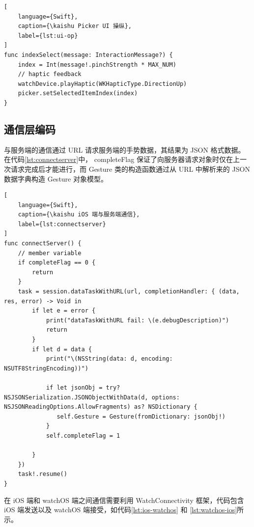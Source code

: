\begin{lstlisting}[
    language={Swift},
    caption={\kaishu Picker UI 操纵},
    label={lst:ui-op}
]
func indexSelect(message: InteractionMessage?) {
    index = Int(message!.pinchStrength * MAX_NUM)
    // haptic feedback
    watchDevice.playHaptic(WKHapticType.DirectionUp)
    picker.setSelectedItemIndex(index)
}
\end{lstlisting}

\subsection{通信层编码}

与服务端的通信通过 URL 请求服务端的手势数据，其结果为 JSON 格式数据。在代码\ref{lst:connectserver}中， completeFlag 保证了向服务器请求对象时仅在上一次请求完成后才能进行，而 Gesture 类的构造函数通过从 URL 中解析来的 JSON 数据字典构造 Gesture 对象模型。

\begin{lstlisting}[
    language={Swift},
    caption={\kaishu iOS 端与服务端通信},
    label={lst:connectserver}
]
func connectServer() {
    // member variable
    if completeFlag == 0 {
        return
    }
    task = session.dataTaskWithURL(url, completionHandler: { (data, res, error) -> Void in
        if let e = error {
            print("dataTaskWithURL fail: \(e.debugDescription)")
            return
        }
        if let d = data {
            print("\(NSString(data: d, encoding: NSUTF8StringEncoding))")

            if let jsonObj = try? NSJSONSerialization.JSONObjectWithData(d, options: NSJSONReadingOptions.AllowFragments) as? NSDictionary {
               self.Gesture = Gesture(fromDictionary: jsonObj!)
            }
            self.completeFlag = 1

        }
    })
    task!.resume()
}
\end{lstlisting}

在 iOS 端和 watchOS 端之间通信需要利用 WatchConnectivity 框架，代码包含 iOS 端发送以及 watchOS 端接受，如代码\ref{lst:ios-watchos} 和 \ref{lst:watchos-ios}所示。

